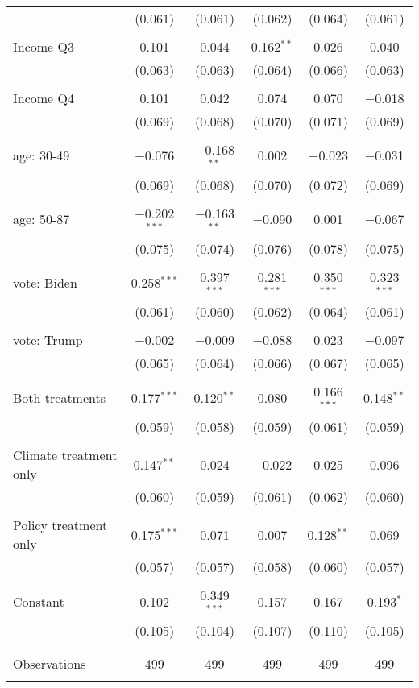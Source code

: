 \begin{tabular}{@{\extracolsep{5pt}}lccccc}
  & (0.061) & (0.061) & (0.062) & (0.064) & (0.061) \\ 
  & & & & & \\ 
 Income Q3 & 0.101 & 0.044 & 0.162$^{**}$ & 0.026 & 0.040 \\ 
  & (0.063) & (0.063) & (0.064) & (0.066) & (0.063) \\ 
  & & & & & \\ 
 Income Q4 & 0.101 & 0.042 & 0.074 & 0.070 & $-$0.018 \\ 
  & (0.069) & (0.068) & (0.070) & (0.071) & (0.069) \\ 
  & & & & & \\ 
 age: 30-49 & $-$0.076 & $-$0.168$^{**}$ & 0.002 & $-$0.023 & $-$0.031 \\ 
  & (0.069) & (0.068) & (0.070) & (0.072) & (0.069) \\ 
  & & & & & \\ 
 age: 50-87 & $-$0.202$^{***}$ & $-$0.163$^{**}$ & $-$0.090 & 0.001 & $-$0.067 \\ 
  & (0.075) & (0.074) & (0.076) & (0.078) & (0.075) \\ 
  & & & & & \\ 
 vote: Biden & 0.258$^{***}$ & 0.397$^{***}$ & 0.281$^{***}$ & 0.350$^{***}$ & 0.323$^{***}$ \\ 
  & (0.061) & (0.060) & (0.062) & (0.064) & (0.061) \\ 
  & & & & & \\ 
 vote: Trump & $-$0.002 & $-$0.009 & $-$0.088 & 0.023 & $-$0.097 \\ 
  & (0.065) & (0.064) & (0.066) & (0.067) & (0.065) \\ 
  & & & & & \\ 
 Both treatments & 0.177$^{***}$ & 0.120$^{**}$ & 0.080 & 0.166$^{***}$ & 0.148$^{**}$ \\ 
  & (0.059) & (0.058) & (0.059) & (0.061) & (0.059) \\ 
  & & & & & \\ 
 Climate treatment only & 0.147$^{**}$ & 0.024 & $-$0.022 & 0.025 & 0.096 \\ 
  & (0.060) & (0.059) & (0.061) & (0.062) & (0.060) \\ 
  & & & & & \\ 
 Policy treatment only & 0.175$^{***}$ & 0.071 & 0.007 & 0.128$^{**}$ & 0.069 \\ 
  & (0.057) & (0.057) & (0.058) & (0.060) & (0.057) \\ 
  & & & & & \\ 
 Constant & 0.102 & 0.349$^{***}$ & 0.157 & 0.167 & 0.193$^{*}$ \\ 
  & (0.105) & (0.104) & (0.107) & (0.110) & (0.105) \\ 
  & & & & & \\ 
\hline \\[-1.8ex] 

Observations & 499 & 499 & 499 & 499 & 499 \\ 
\hline 
\hline \\[-1.8ex] 
\end{tabular} 